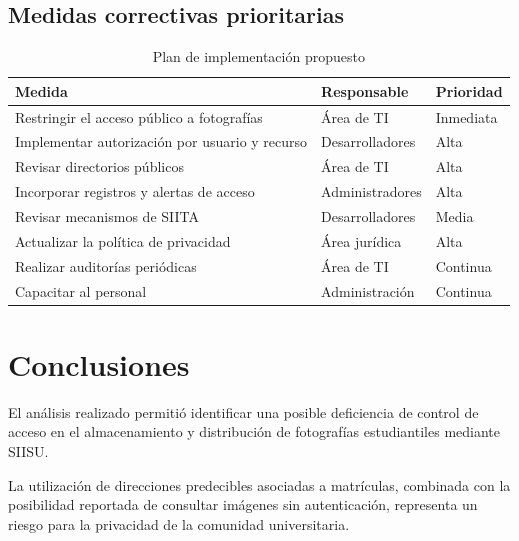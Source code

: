 \documentclass[12pt]{article}
\begin{document}
\subsection{Medidas correctivas prioritarias}

\begin{table}[H]
\centering
\caption{Plan de implementación propuesto}
\label{tab:implementacion}
\small
\begin{tabularx}{\textwidth}{|X|X|l|}
\hline
\textbf{Medida} &
\textbf{Responsable} &
\textbf{Prioridad} \\ \hline

Restringir el acceso público
a fotografías &
Área de TI &
Inmediata \\ \hline

Implementar autorización
por usuario y recurso &
Desarrolladores &
Alta \\ \hline

Revisar directorios públicos &
Área de TI &
Alta \\ \hline

Incorporar registros
y alertas de acceso &
Administradores &
Alta \\ \hline

Revisar mecanismos de SIITA &
Desarrolladores &
Media \\ \hline

Actualizar la política
de privacidad &
Área jurídica &
Alta \\ \hline

Realizar auditorías periódicas &
Área de TI &
Continua \\ \hline

Capacitar al personal &
Administración &
Continua \\ \hline

\end{tabularx}
\end{table}

\section{Conclusiones}

El análisis realizado permitió
identificar una posible deficiencia
de control de acceso en el
almacenamiento y distribución
de fotografías estudiantiles
mediante SIISU.

La utilización de direcciones
predecibles asociadas a matrículas,
combinada con la posibilidad
reportada de consultar imágenes
sin autenticación, representa
un riesgo para la privacidad
de la comunidad universitaria.
\end{document}
